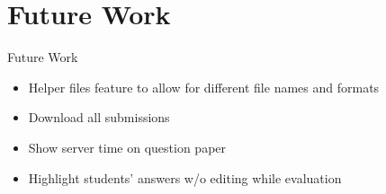 \section{Future Work}
\begin{frame}{Future Work}
    \begin{itemize}
    \item Helper files feature to allow for different file names and formats
    \item Download all submissions
    \item Show server time on question paper
    \item Highlight students’ answers w/o editing while evaluation
    \end{itemize}
\end{frame}
